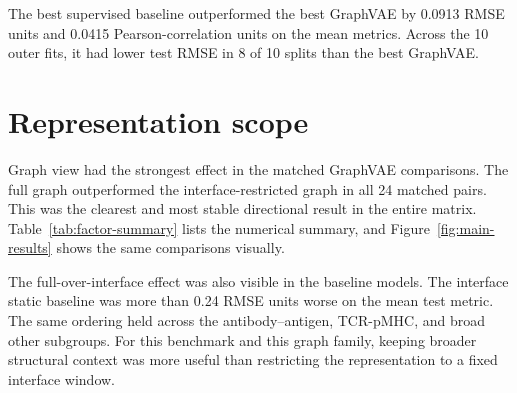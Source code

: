 The best supervised baseline outperformed the best GraphVAE by 0.0913 RMSE units and 0.0415 Pearson-correlation units on the mean metrics. Across the 10 outer fits, it had lower test RMSE in 8 of 10 splits than the best GraphVAE.

\section{Representation scope}

Graph view had the strongest effect in the matched GraphVAE comparisons. The full graph outperformed the interface-restricted graph in all 24 matched pairs. This was the clearest and most stable directional result in the entire matrix. Table~\ref{tab:factor-summary} lists the numerical summary, and Figure~\ref{fig:main-results} shows the same comparisons visually.

\begin{table}[t]
\centering
\small
{}
\caption{Matched GraphVAE comparisons. A positive RMSE gain means the first-named option has lower mean test RMSE.}
\label{tab:factor-summary}
\end{table}

The full-over-interface effect was also visible in the baseline models. The interface static baseline was more than 0.24 RMSE units worse on the mean test metric. The same ordering held across the antibody--antigen, TCR-pMHC, and broad other subgroups. For this benchmark and this graph family, keeping broader structural context was more useful than restricting the representation to a fixed interface window.

